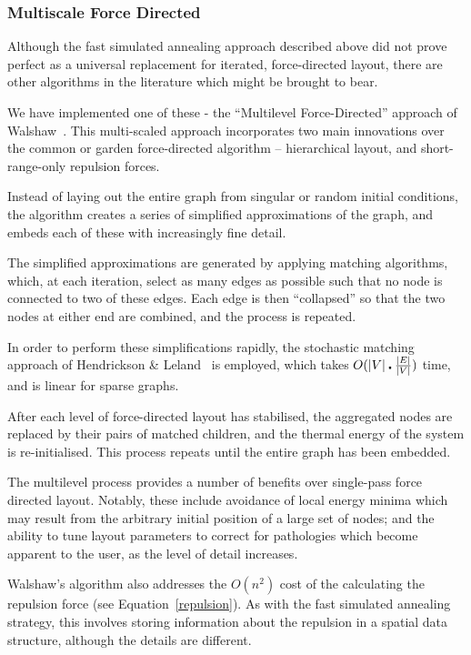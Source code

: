 \documentclass[runningheads]{cl2emult}
\begin{document}
\subsubsection{Multiscale Force Directed}

Although the fast simulated annealing approach described above did not prove
perfect as a universal replacement for iterated, force-directed layout, there
are other algorithms in the literature which might be brought to bear.

We have implemented one of these - the ``Multilevel Force-Directed'' approach
of Walshaw~\cite{walshaw00multilevel}.  This multi-scaled approach
incorporates two main innovations over the common or garden force-directed
algorithm -- hierarchical layout, and short-range-only repulsion forces.

Instead of laying out the entire graph from singular or random initial
conditions, the algorithm creates a series of simplified approximations of
the graph, and embeds each of these with increasingly fine detail.

The simplified approximations are generated by applying matching algorithms,
which, at each iteration, select as many edges as possible such that
no node is connected to two of these edges.  Each edge is then ``collapsed''
so that the two nodes at either end are combined, and the process is repeated.

In order to perform these simplifications rapidly, the stochastic matching
approach of Hendrickson \& Leland~\cite{hendrickson95multilevel} is employed,
which takes $O(|V| \centerdot {|E| \over |V|})$ time, and is linear for
sparse graphs.

After each level of force-directed layout has stabilised, the aggregated
nodes are replaced by their pairs of matched children, and the thermal energy
of the system is re-initialised.  This process repeats until the entire graph
has been embedded.

The multilevel process provides a number of benefits over single-pass force
directed layout.  Notably, these include avoidance of local energy minima
which may result from the arbitrary initial position of a large set of nodes;
and the ability to tune layout parameters to correct for pathologies which
become apparent to the user, as the level of detail increases.

Walshaw's algorithm also addresses the $O(n^2)$ cost of the calculating the
repulsion force (see Equation~\ref{repulsion}).  As with the fast simulated
annealing strategy, this involves storing information about the repulsion in
a spatial data structure, although the details are different.
\end{document}
